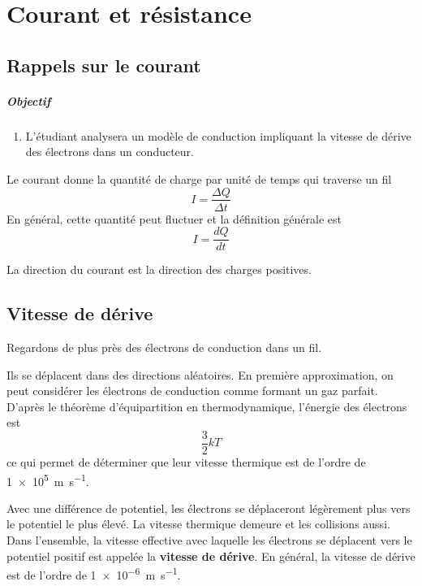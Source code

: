 \chapter{Courant et résistance}

\section{Rappels sur le courant}


\paragraph{Objectif}

\begin{enumerate}
  \item L'étudiant analysera un modèle de conduction impliquant la vitesse de
    dérive des électrons dans un conducteur.
\end{enumerate}


Le courant donne la quantité de charge par unité de temps qui traverse un fil
$$I = \frac{\Delta Q}{\Delta t}$$
En général, cette quantité peut fluctuer et la définition générale est
$$I = \frac{dQ}{dt}$$

La direction du courant est la direction des charges positives.



\section{Vitesse de dérive}


Regardons de plus près des électrons de conduction dans un fil.

Ils se déplacent dans des directions aléatoires. En première approximation, on
peut considérer les électrons de conduction comme formant un gaz parfait.
D'après le théorème d'équipartition en thermodynamique, l'énergie des électrons
est
$$\frac{3}{2} kT$$
ce qui permet de déterminer que leur vitesse thermique est de l'ordre de
\SI{1e5}{m\per s}.

Avec une différence de potentiel, les électrons se déplaceront légèrement plus
vers le potentiel le plus élevé. La vitesse thermique demeure et les collisions
aussi. Dans l'ensemble, la vitesse effective avec laquelle les électrons se
déplacent vers le potentiel positif est appelée la \textbf{vitesse de dérive}.
En général, la vitesse de dérive est de l'ordre de \SI{1e-6}{m\per s}.


